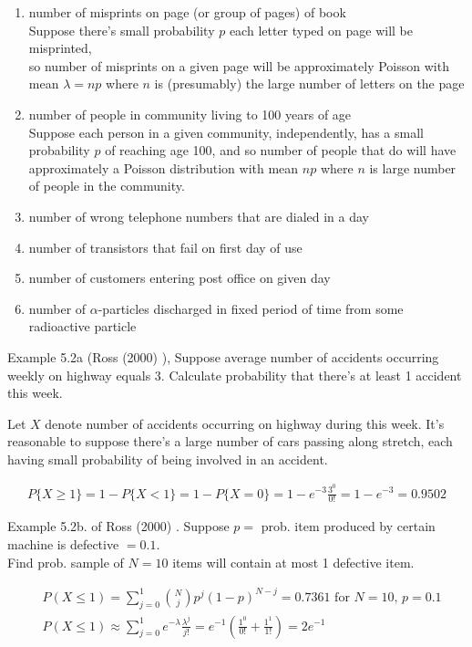 \begin{enumerate}
	\item number of misprints on page (or group of pages) of book \\
	Suppose there's small probability $p$ each letter typed on page will be misprinted,\\
	so number of misprints on a given page will be approximately Poisson with mean $\lambda = np$ where $n$ is (presumably) the large number of letters on the page
	\item number of people in community living to 100 years of age \\
	Suppose each person in a given community, independently, has a small probability $p$ of reaching age 100, and so number of people that do will have approximately a Poisson distribution with mean $np$ where $n$ is large number of people in the community.
	\item number of wrong telephone numbers that are dialed in a day
	\item number of transistors that fail on first day of use
	\item number of customers entering post office on given day
	\item number of $\alpha$-particles discharged in fixed period of time from some radioactive particle
\end{enumerate}

Example 5.2a (Ross (2000) \cite{dgdt:Ross2000}), Suppose average number of accidents occurring weekly on highway equals 3. Calculate probability that there's at least 1 accident this week.

 Let $X$ denote number of accidents occurring on highway during this week. It's reasonable to suppose there's a large number of cars passing along stretch, each having small probability of being involved in an accident.

\[
\begin{gathered}
	P\lbrace X \geq 1 \rbrace = 1 - P \lbrace X < 1 \rbrace = 1 - P \lbrace X = 0 \rbrace = 1 - e^{-3} \frac{3^0}{0!} = 1 - e^{-3} = 0.9502
\end{gathered}
\]

Example 5.2b. of Ross (2000) \cite{dgdt:Ross2000}. Suppose $p = $ prob. item produced by certain machine is defective $= 0.1$. \\
Find prob. sample of $N=10$ items will contain at most 1 defective item.

\[
\begin{aligned}
& P(X \leq 1) = \sum_{j=0}^1 \binom{N}{j} p^j (1-  p)^{N-j} = 0.7361 \text{ for } N = 10, \, p = 0.1 \\
& P(X \leq 1) \approx \sum_{j=0}^1 e^{-\lambda} \frac{\lambda^j}{j!} = e^{-1} \left( \frac{1^0 }{ 0!} + \frac{1^1}{1!} \right) = 2 e^{-1}
\end{aligned}
\]


